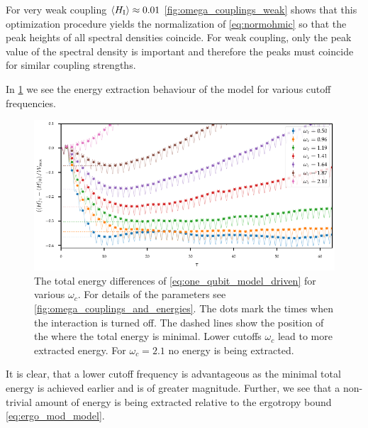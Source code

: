 For very weak coupling \(\ev{H_{\inter}}\approx 0.01\)
\cref{fig:omega_couplings_weak} shows that this optimization procedure
yields the normalization of \cref{eq:normohmic} so that the peak
heights of all spectral densities coincide. For weak coupling, only
the peak value of the spectral density is important and therefore the
peaks must coincide for similar coupling strengths.

In \cref{fig:omegas_total} we see the energy extraction behaviour of
the model for various cutoff frequencies.
\begin{figure}[htp]
  \centering
  \includegraphics{figs/one_bath_mod/omegas_total}
  \caption{\label{fig:omegas_total} The total energy differences of
    \cref{eq:one_qubit_model_driven} for various \(ω_{c}\). For
    details of the parameters see
    \cref{fig:omega_couplings_and_energies}. The dots mark the times
    when the interaction is turned off.  The dashed lines show the
    position of the where the total energy is minimal. Lower cutoffs
    \(ω_{c}\) lead to more extracted energy. For \(ω_{c}=2.1\) no
    energy is being extracted.}
\end{figure}
It is clear, that a lower cutoff frequency is advantageous as the
minimal total energy is achieved earlier and is of greater
magnitude. Further, we see that a non-trivial amount of energy is
being extracted relative to the ergotropy bound
\cref{eq:ergo_mod_model}.

